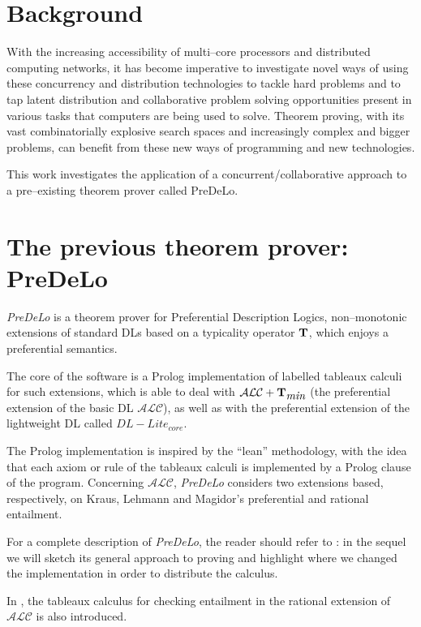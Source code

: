 \documentclass[a4paper, 11pt, oneside]{duthesis}
\newcommand{\tip}{{\bf T}}
\newcommand{\alc}{\mathcal{ALC}}
\newcommand{\alctmin}{\mathcal{ALC}+\tip_{\mbox{\em min}}}
\begin{document}
\chapter{Background}\label{bg}
With the increasing accessibility of multi--core processors and distributed computing networks, it has become imperative to investigate novel ways of using these concurrency and distribution technologies to tackle hard problems and to tap latent distribution and collaborative problem solving opportunities present in various tasks that computers are being used to solve.
Theorem proving, with its vast combinatorially explosive search spaces and increasingly complex and bigger problems, can benefit from these new ways of programming and new technologies\cite{conf/ieeehpcs/SripriyaBS09}.


This work investigates the application of a concurrent/collaborative approach to a pre--existing theorem prover called PreDeLo.

\chapter{The previous theorem prover: PreDeLo}\label{predelo}
\emph{PreDeLo} is a theorem prover for Preferential Description Logics, non--monotonic extensions of standard DLs based on a typicality operator $\tip$, which enjoys a preferential semantics.

The core of the software is a Prolog implementation of labelled tableaux calculi for such extensions, which is able to deal with $\alctmin$ (the preferential extension of the basic DL $\alc$), as well as with the preferential extension of the lightweight DL called $DL-Lite_{core}$.

The Prolog implementation is inspired by the ``lean'' methodology, with the idea that each axiom or rule of the tableaux calculi is implemented by a Prolog clause of the program.
Concerning $\alc$, \emph{PreDeLo} considers two extensions based, respectively, on Kraus, Lehmann and Magidor’s preferential and rational entailment.

For a complete description of \emph{PreDeLo}, the reader should refer to \cite{conf/aiia/GiordanoGJOP13}: in the sequel we will sketch its general approach to proving and highlight where we changed the implementation in order to distribute the calculus.

In \cite{conf/aiia/GiordanoGJOP13}, the tableaux calculus for checking entailment in the rational extension of $\alc$ is also introduced.
\end{document}
